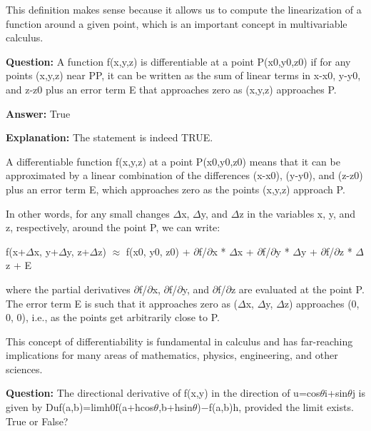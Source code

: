 \documentclass{article}
\begin{document}
This definition makes sense because it allows us to compute the linearization of a function around a given point, which is an important concept in multivariable calculus.
                
                \vspace{0.5cm} 
        
            
                \textbf {Question:} A function f(x,y,z) is differentiable at a point P(x0,y0,z0) if for any points (x,y,z) near PP, it can be written as the sum of linear terms in x-x0, y-y0, and z-z0 plus an error term E that approaches zero as (x,y,z) approaches P.
                
                \textbf{Answer:} True

                \textbf{Explanation:} The statement is indeed TRUE.

A differentiable function f(x,y,z) at a point P(x0,y0,z0) means that it can be approximated by a linear combination of the differences (x-x0), (y-y0), and (z-z0) plus an error term E, which approaches zero as the points (x,y,z) approach P.

In other words, for any small changes \ensuremath{\Delta}x, \ensuremath{\Delta}y, and \ensuremath{\Delta}z in the variables x, y, and z, respectively, around the point P, we can write:

f(x+\ensuremath{\Delta}x, y+\ensuremath{\Delta}y, z+\ensuremath{\Delta}z) \ensuremath{\approx} f(x0, y0, z0) + \ensuremath{\partial}f/\ensuremath{\partial}x * \ensuremath{\Delta}x + \ensuremath{\partial}f/\ensuremath{\partial}y * \ensuremath{\Delta}y + \ensuremath{\partial}f/\ensuremath{\partial}z * \ensuremath{\Delta}z + E

where the partial derivatives \ensuremath{\partial}f/\ensuremath{\partial}x, \ensuremath{\partial}f/\ensuremath{\partial}y, and \ensuremath{\partial}f/\ensuremath{\partial}z are evaluated at the point P. The error term E is such that it approaches zero as (\ensuremath{\Delta}x, \ensuremath{\Delta}y, \ensuremath{\Delta}z) approaches (0, 0, 0), i.e., as the points get arbitrarily close to P.

This concept of differentiability is fundamental in calculus and has far-reaching implications for many areas of mathematics, physics, engineering, and other sciences.
                
                \vspace{0.5cm} 
        
            
                \textbf {Question:} The directional derivative of f(x,y) in the direction of u=cos\ensuremath{\theta}i+sin\ensuremath{\theta}j is given by Duf(a,b)=limh{\textrightarrow}0f(a+hcos\ensuremath{\theta},b+hsin\ensuremath{\theta})\ensuremath{-}f(a,b)h, provided the limit exists. True or False?
                
\end{document}
